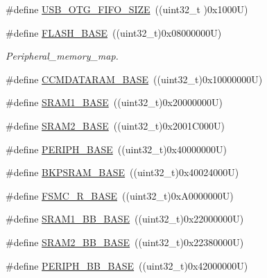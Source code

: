 \begin{DoxyCompactItemize}
\item 
\#define \hyperlink{group___peripheral__registers__structures_ga8781c4b2406c740d9fe540737a6a0188}{U\+S\+B\+\_\+\+O\+T\+G\+\_\+\+F\+I\+F\+O\+\_\+\+S\+I\+ZE}~((uint32\+\_\+t )0x1000\+U)
\item 
\#define \hyperlink{group___peripheral__registers__structures_ga23a9099a5f8fc9c6e253c0eecb2be8db}{F\+L\+A\+S\+H\+\_\+\+B\+A\+SE}~((uint32\+\_\+t)0x08000000\+U)
\begin{DoxyCompactList}\small\item\em Peripheral\+\_\+memory\+\_\+map. \end{DoxyCompactList}\item 
\#define \hyperlink{group___peripheral__registers__structures_gabea1f1810ebeac402164b42ab54bcdf9}{C\+C\+M\+D\+A\+T\+A\+R\+A\+M\+\_\+\+B\+A\+SE}~((uint32\+\_\+t)0x10000000\+U)
\item 
\#define \hyperlink{group___peripheral__registers__structures_ga7d0fbfb8894012dbbb96754b95e562cd}{S\+R\+A\+M1\+\_\+\+B\+A\+SE}~((uint32\+\_\+t)0x20000000\+U)
\item 
\#define \hyperlink{group___peripheral__registers__structures_gadbb42a3d0a8a90a79d2146e4014241b1}{S\+R\+A\+M2\+\_\+\+B\+A\+SE}~((uint32\+\_\+t)0x2001\+C000\+U)
\item 
\#define \hyperlink{group___peripheral__registers__structures_ga9171f49478fa86d932f89e78e73b88b0}{P\+E\+R\+I\+P\+H\+\_\+\+B\+A\+SE}~((uint32\+\_\+t)0x40000000\+U)
\item 
\#define \hyperlink{group___peripheral__registers__structures_ga52e57051bdf8909222b36e5408a48f32}{B\+K\+P\+S\+R\+A\+M\+\_\+\+B\+A\+SE}~((uint32\+\_\+t)0x40024000\+U)
\item 
\#define \hyperlink{group___peripheral__registers__structures_gaddf0e199dccba83272b20c9fb4d3aaed}{F\+S\+M\+C\+\_\+\+R\+\_\+\+B\+A\+SE}~((uint32\+\_\+t)0x\+A0000000\+U)
\item 
\#define \hyperlink{group___peripheral__registers__structures_gac4c4f61082e4b168f29d9cf97dc3ca5c}{S\+R\+A\+M1\+\_\+\+B\+B\+\_\+\+B\+A\+SE}~((uint32\+\_\+t)0x22000000\+U)
\item 
\#define \hyperlink{group___peripheral__registers__structures_gac33cb6edadf184ab9860d77089503922}{S\+R\+A\+M2\+\_\+\+B\+B\+\_\+\+B\+A\+SE}~((uint32\+\_\+t)0x22380000\+U)
\item 
\#define \hyperlink{group___peripheral__registers__structures_gaed7efc100877000845c236ccdc9e144a}{P\+E\+R\+I\+P\+H\+\_\+\+B\+B\+\_\+\+B\+A\+SE}~((uint32\+\_\+t)0x42000000\+U)
\item 

\end{DoxyCompactItemize}
